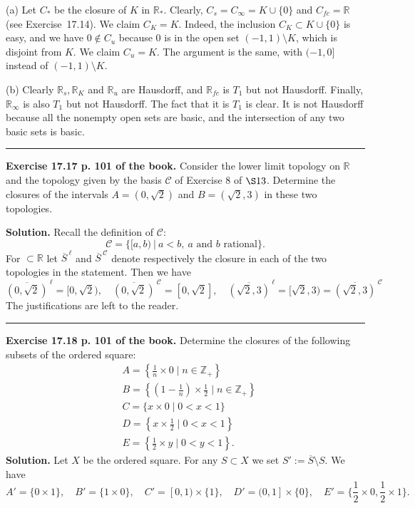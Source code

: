 \documentclass[12pt,letterpaper]{article}
\newcommand{\hs}{\bigskip\hrule\medskip}
\newcommand{\mc}{\mathcal}
\newcommand{\noi}{\noindent}%
\newcommand{\sm}{\setminus}
\newcommand{\R}{\mathbb R}
\begin{document}
\noi(a) Let $C_*$ be the closure of $K$ in $\R_*$. Clearly, $C_s=C_\infty=K\cup\{0\}$ and $C_{fc}=\R$ (see Exercise~17.14). We claim $C_K=K$. Indeed, the inclusion $C_K\subset K\cup\{0\}$ is easy, and we have $0\notin C_u$ because 0 is in the open set $(-1,1)\sm K$, which is disjoint from $K$. We claim $C_u=K$. The argument is the same, with $(-1,0]$ instead of $(-1,1)\sm K$.  

\noi(b) Clearly $\R_s,\R_K$ and $\R_u$ are Hausdorff, and $\R_{fc}$ is $T_1$ but not Hausdorff. Finally, $\R_\infty$ is also $T_1$ but not Hausdorff. The fact that it is $T_1$ is clear. It is not Hausdorff because all the nonempty open sets are basic, and the intersection of any two basic sets is basic. 

\hs 

\noi\textbf{Exercise 17.17 p. 101 of the book.} Consider the lower limit topology on $\mathbb{R}$ and the topology given by the basis $\mathcal{C}$ of Exercise 8 of $\S 13$. Determine the closures of the intervals $A=(0,\sqrt{2})$ and $B=(\sqrt{2},3)$ in these two topologies. 

\noi\textbf{Solution.} Recall the definition of $\mc C$: 
$$
\mc C=\{[a,b)\ |\ a<b,\ a \text{ and $b$ rational}\}.
$$ 
For $\subset\R$ let ${\overline S\,}^\ell$ and ${\overline S\,}^{\mc C}$ denote respectively the closure in each of the two topologies in the statement. Then we have 
$$
{\overline{(0,\sqrt2)}\,}^\ell=[0,\sqrt2),\quad{\overline{(0,\sqrt2)}\,}^{\mc C}=[0,\sqrt2],\quad
{\overline{(\sqrt2,3)}\,}^\ell=[\sqrt2,3)={\overline{(\sqrt2,3)}\,}^{\mc C}
$$ 
The justifications are left to the reader. 

\hs

\noi\textbf{Exercise 17.18 p. 101 of the book.} Determine the closures of the following subsets of the ordered square:
    \[
    \begin{aligned}
    & A = \left\{\textstyle{\frac{1}{n}}\times 0 \mid n \in \mathbb{Z}_{+}\right\} \\
    & B = \left\{(1-\textstyle{\frac{1}{n}})\times\textstyle{\frac{1}{2}} \mid n \in \mathbb{Z}_{+}\right\} \\
    & C = \{x \times 0 \mid 0 < x < 1\} \\
    & D = \left\{x \times \textstyle{\frac{1}{2}} \mid 0 < x < 1\right\} \\
    & E = \left\{\textstyle{\frac{1}{2}} \times y \mid 0 < y < 1\right\}.
    \end{aligned}
    \]
\noi\textbf{Solution.} Let $X$ be the ordered square. For any $S\subset X$ we set $S':=\overline S\sm S$. We have 
$$
A'=\{0\times1\},\quad B'=\{1\times0\},\quad C'=[0,1)\times\{1\},\quad D'=(0,1]\times\{0\},\quad E'=\{\textstyle{\frac{1}{2}}\times0,\textstyle{\frac{1}{2}}\times1\}.
$$ 
\end{document}
